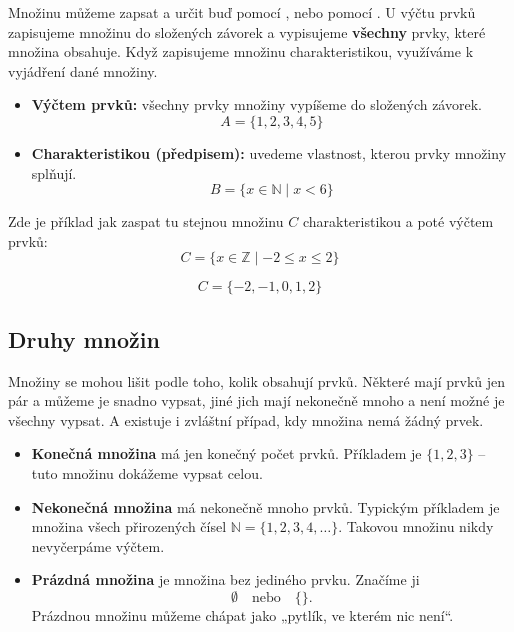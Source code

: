 \documentclass[12pt,a4paper]{article}
\begin{document}
Množinu můžeme zapsat a určit buď pomocí , nebo pomocí .  
U výčtu prvků zapisujeme množinu do složených závorek a vypisujeme \textbf{všechny} prvky, které množina obsahuje.  
Když zapisujeme množinu charakteristikou, využíváme  k vyjádření dané množiny.

\begin{itemize}
    \item \textbf{Výčtem prvků:} všechny prvky množiny vypíšeme do složených závorek.
    \[
    A = \{1,2,3,4,5\}
    \]

    \item \textbf{Charakteristikou (předpisem):} uvedeme vlastnost, kterou prvky množiny splňují.
    \[
    B = \{x \in \mathbb{N} \mid x < 6\}
    \]
\end{itemize}

\begin{examplebox}
    Zde je příklad jak zaspat tu stejnou množinu $C$ charakteristikou a poté výčtem prvků:
    \[
    C = \{x \in \mathbb{Z} \mid -2 \leq x \leq 2\}
    \]
    
    \[
    C = \{-2,-1,0,1,2\}
    \]

\end{examplebox}

\subsection{Druhy množin}

Množiny se mohou lišit podle toho, kolik obsahují prvků. 
Některé mají prvků jen pár a můžeme je snadno vypsat, 
jiné jich mají nekonečně mnoho a není možné je všechny vypsat. 
A existuje i zvláštní případ, kdy množina nemá žádný prvek.  

\begin{itemize}
    \item \textbf{Konečná množina} má jen konečný počet prvků.  
    Příkladem je $\{1,2,3\}$ – tuto množinu dokážeme vypsat celou.
    
    \item \textbf{Nekonečná množina} má nekonečně mnoho prvků.  
    Typickým příkladem je množina všech přirozených čísel $\mathbb{N} = \{1,2,3,4,\dots\}$.  
    Takovou množinu nikdy nevyčerpáme výčtem.

    \item \textbf{Prázdná množina} je množina bez jediného prvku.  
    Značíme ji
    \[
    \emptyset \quad \text{nebo} \quad \{\}.
    \]  
    Prázdnou množinu můžeme chápat jako „pytlík, ve kterém nic není“.
\end{itemize}
\end{document}
